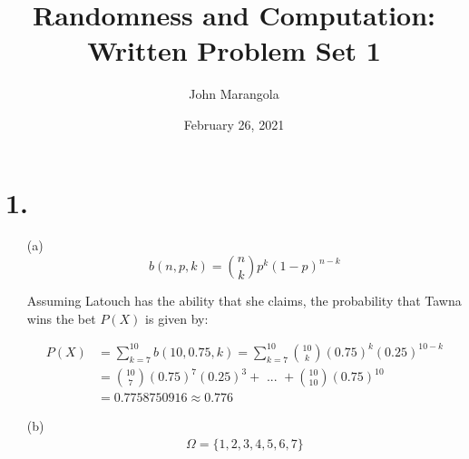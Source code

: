 \documentclass[12pt]{article}
\title{Randomness and Computation: Written Problem Set 1}
\author{John Marangola}
\date{February 26, 2021}
\begin{document}
\maketitle

\newcommand{\ec}{\frac{1}{4\pi\epsilon_0}}
\newcommand{\qa}{\frac{q^2}{a^2}}
\newcommand{\ih}{\hat{i}}
\newcommand{\jh}{\hat{j}}
\newcommand{\kh}{\hat{k}}
\newcommand{\at}[2][]{#1|_{#2}}
\section*{1.}
    \begin{enumerate}
        \item[(a)]
        \begin{equation}
            b(n, p, k) = \binom{n}{k}p^{k}\left(1-p\right)^{n-k}
        \end{equation}
        \begin{flushleft}
            Assuming Latouch has the ability that she claims, the probability that Tawna wins the bet $P(X)$ is given by:
        \end{flushleft}
        \begin{align*}
            P(X) &= \sum_{k=7}^{10}{b(10, 0.75, k)} = \sum_{k=7}^{10}{\binom{10}{k}(0.75)^{k}\left(0.25\right)^{10-k}} \\
            &= \binom{10}{7}(0.75)^7 (0.25)^3 +\text{ ... } + \binom{10}{10}(0.75)^{10} \\
            &= 0.7758750916 \approx 0.776
        \end{align*}
        \item[(b)] 
            \begin{align*}
                \Omega = \{1, 2, 3, 4, 5, 6, 7\} 
            \end{align*}
        
    \end{enumerate}
\end{document}
